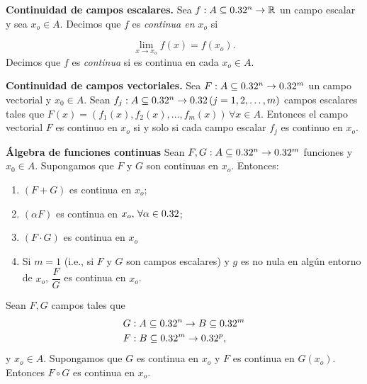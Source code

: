 


\begin{definition} \textbf{Continuidad de campos escalares.}  \label{def:cont} Sea $f : A  \subseteq  0.32^n \to \mathbb{R}$ un campo escalar y sea $x_o \in A$. Decimos que
$f$ es \emph{continua en $x_o$} si
 
 $$\lim_{x \to x_o} f(x) = f(x_o).$$  Decimos que $f$ es \emph{continua} si es continua en cada $x_o \in A$.
\end{definition}

\begin{propertie} \label{prop:cont_x_comp}\textbf{Continuidad de campos vectoriales.}
 Sea $F: A  \subseteq  0.32^n \to 0.32^m$ un campo vectorial y $x_0 \in A$. Sean $f_j: A  \subseteq  0.32^n \to 0.32 \, (j = 1,2, \dots, m)$ campos escalares tales que $F(x) = \left( f_1(x), f_2(x), \dots, f_m(x) \right) \, \forall x \in A$. Entonces el campo vectorial $F$ es continuo en $x_o$ si y solo si cada campo escalar $f_j$ es continuo en $x_o$.
\end{propertie}

\begin{propertie}\label{prop:alg_con}    \textbf{\'Algebra de funciones continuas}   Sean $F,G:A  \subseteq  0.32^n \to 0.32^m$  funciones y $x_0 \in A$. Supongamos que
$F$ y $G$ son continuas en $x_o$.
  Entonces:
  \begin{enumerate} 
   \item[1.] $(F + G)$ es continua en $x_o$;
   \item[2.] $(\alpha F)$  es continua en $x_o, \, \forall \alpha \in 0.32$;
   \item[3.] $(F\cdot G)$ es continua en $x_o$  %
   \item[4.] Si $m = 1$ (i.e., si $F \text{ y } G$ son campos escalares) y $g$ es no nula en alg\'un entorno de $x_o$, $\dfrac{F}{G}$ es continua en $x_o$.
  \end{enumerate}
\end{propertie}


\begin{propertie} \label{prop:cont_comp} Sean $F, G$ campos tales que
\begin{align*}
 G &:A  \subseteq  0.32^n \to B  \subseteq  0.32^m \\
 F &:B  \subseteq  0.32^m \to 0.32^p,
\end{align*}
y $x_o \in A$. Supongamos que $G$ es continua en $x_o$ y $F$ es continua en $G(x_o)$. Entonces $F \circ G$ es continua en $x_o$.
\end{propertie}




